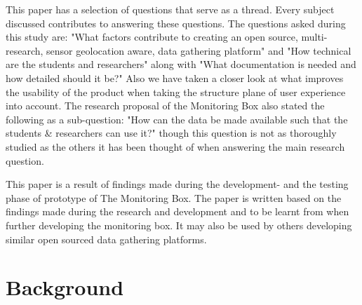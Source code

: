 \documentclass[conference]{IEEEtran}
\begin{document}
\par
This paper has a selection of questions that serve as a thread. Every subject discussed contributes to answering these questions. The questions asked during this study are: "What factors contribute to creating an open source, multi-research, sensor geolocation aware, data gathering platform"  \cite{monitoringBox2017researchproposal} and "How technical are the students and researchers" along with "What documentation is needed and how detailed should it be?" Also we have taken a closer look at what improves the usability of the product when taking the structure plane of user experience into account. \cite{monitoringBox2017researchproposal} The research proposal of the Monitoring Box also stated the following as a sub-question: "How can the data be made available such that the students \& researchers can use it?" \cite{monitoringBox2017researchproposal} though this question is not as thoroughly studied as the others it has been thought of when answering the main research question.  

\par
This paper is a result of findings made during the development-  and the testing phase of prototype of The Monitoring Box. The paper is written based on the findings made during the research and development and to be learnt from when further developing the monitoring box. It may also be used by others developing similar open sourced data gathering platforms.

\section{Background}
\end{document}
